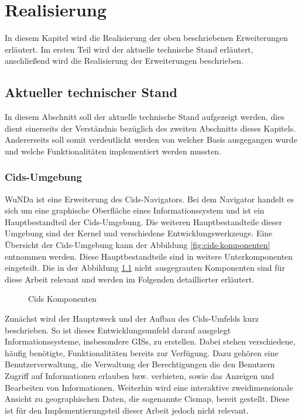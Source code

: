 \chapter{Realisierung} \label{ch:realisierung}

In diesem Kapitel wird die Realisierung der oben beschriebenen Erweiterungen erläutert.
Im ersten Teil wird der aktuelle technische Stand erläutert, anschließend wird die Realisierung der Erweiterungen beschrieben. 

\section{Aktueller technischer Stand}

In diesem Abschnitt soll der aktuelle technische Stand aufgezeigt werden, dies dient einerseits der Verständnis bezüglich des zweiten Abschnitts dieses Kapitels.
Andererseits soll somit verdeutlicht werden von welcher Basis ausgegangen wurde und welche Funktionalitäten implementiert werden mussten. 

\subsection{Cids-Umgebung}
\ac{WuNDa} ist eine Erweiterung des Cids-Navigators. Bei dem Navigator handelt es sich um eine graphische Oberfläche eines Informationssystem und ist ein Hauptbestandteil der Cids-Umgebung. Die weiteren Hauptbestandteile dieser Umgebung sind  
der Kernel und verschiedene Entwicklungswerkzeuge. Eine Übersicht der Cids-Umgebung kann der Abbildung \vref{fig:cids-komponenten} entnommen werden. Diese Hauptbestandteile sind in weitere Unterkomponenten eingeteilt. Die in der Abbildung \ref{fig:cids-komponenten} nicht ausgegrauten Komponenten sind für diese Arbeit relevant und werden im Folgenden detaillierter erläutert.

\begin{figure}[htb]
	\centering
	\caption{Cids Komponenten}
	\label{fig:cids-komponenten}
\end{figure}

Zunächst wird der Hauptzweck und der Aufbau des Cids-Umfelds kurz beschrieben. So ist dieses Entwicklungsumfeld darauf ausgelegt Informationssysteme, insbesondere \acp{GIS}, zu erstellen.
Dabei stehen verschiedene, häufig benötigte, Funktionalitäten bereits zur Verfügung. Dazu gehören eine Benutzerverwaltung, die Verwaltung der Berechtigungen die den Benutzern Zugriff auf Informationen erlauben bzw. verbieten, sowie das Anzeigen und Bearbeiten von Informationen. Weiterhin wird eine interaktive zweidimensionale Ansicht zu geographischen Daten, die sogenannte Cismap, bereit gestellt.
Diese ist für den Implementierungsteil dieser Arbeit jedoch nicht relevant.

